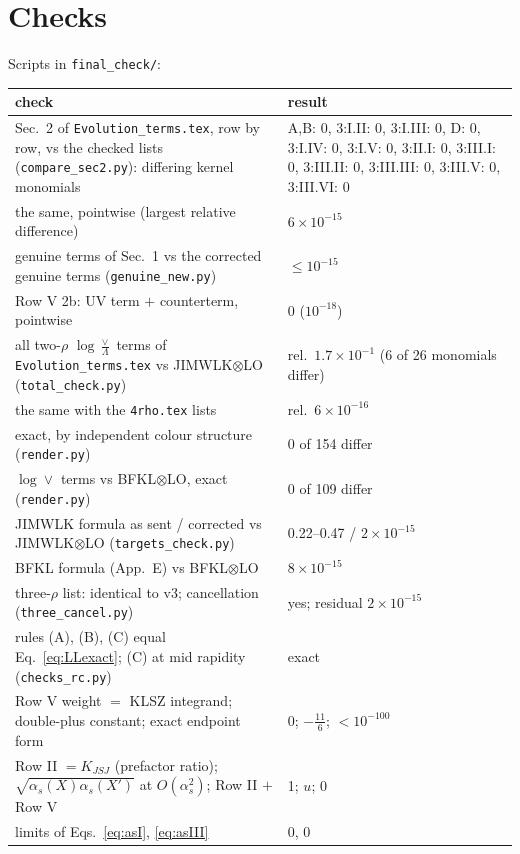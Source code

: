 \documentclass[10pt]{article}
\numberwithin{equation}{section}
\begin{document}
\section{Checks}\label{sec:checks}
Scripts in \texttt{final\_check/}:
\begin{center}\small
\begin{tabular}{@{}p{}p{}@{}}\toprule
check & result\\\midrule
Sec.~2 of \texttt{Evolution\_terms.tex}, row by row, vs the checked lists (\texttt{compare\_sec2.py}): differing kernel monomials & A,B: 0, 3:I.II: 0, 3:I.III: 0, D: 0, 3:I.IV: 0, 3:I.V: 0, 3:II.I: 0, 3:III.I: 0, 3:III.II: 0, 3:III.III: 0, 3:III.V: 0, 3:III.VI: 0\\
the same, pointwise (largest relative difference) & $6\times10^{-15}$\\
genuine terms of Sec.~1 vs the corrected genuine terms (\texttt{genuine\_new.py}) & $\le10^{-15}$\\
Row V 2b: UV term $+$ counterterm, pointwise & 0 ($10^{-18}$)\\
all two-$\rho$ $\log\frac{\vee}{\Lambda}$ terms of \texttt{Evolution\_terms.tex} vs JIMWLK$\otimes$LO (\texttt{total\_check.py}) & rel.\ $1.7\times10^{-1}$ (6 of 26 monomials differ)\\
the same with the \texttt{4rho.tex} lists & rel.\ $6\times10^{-16}$\\
exact, by independent colour structure (\texttt{render.py}) & 0 of 154 differ\\
$\log\vee$ terms vs BFKL$\otimes$LO, exact (\texttt{render.py}) & 0 of 109 differ\\
JIMWLK formula as sent / corrected vs JIMWLK$\otimes$LO (\texttt{targets\_check.py}) & 0.22--0.47 / $2\times10^{-15}$\\
BFKL formula (App.~E) vs BFKL$\otimes$LO & $8\times10^{-15}$\\
three-$\rho$ list: identical to v3; cancellation (\texttt{three\_cancel.py}) & yes; residual $2\times10^{-15}$\\
rules (A), (B), (C) equal Eq.~\eqref{eq:LLexact}; (C) at mid rapidity (\texttt{checks\_rc.py}) & exact\\
Row V weight $=$ KLSZ integrand; double-plus constant; exact endpoint form & 0; $-\frac{11}{6}$; $<10^{-100}$\\
Row II $=K_{JSJ}$ (prefactor ratio); $\sqrt{\alpha_s(X)\alpha_s(X')}$ at $O(\alpha_s^2)$; Row II $+$ Row V & 1; $u$; 0\\
limits of Eqs.~\eqref{eq:asI}, \eqref{eq:asIII} & 0, 0\\\bottomrule
\end{tabular}
\end{center}
\end{document}

